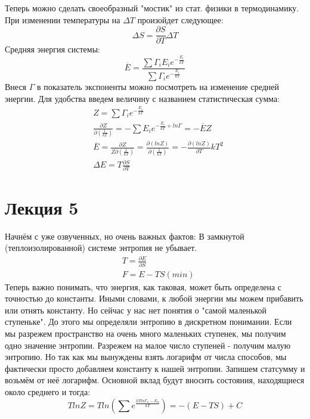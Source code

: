 \documentclass[a4paper, 12pt]{article}
\begin{document}
	Теперь можно сделать своеобразный "мостик" из стат. физики в термодинамику. При изменении температуры на $\Delta T$ произойдет следующее:
	\begin{equation*}	
		\Delta S = \frac{\partial S}{\partial T} \Delta T
	\end{equation*}
	Средняя энергия системы:
	$$
	\overline{E} = \frac{\sum \Gamma_{i} E_{i} e^{-\frac{E_{i}}{kT}}  }{\sum \Gamma_{i}  e^{-\frac{E_{i}}{kT}} }
	$$
	Внеся $\Gamma$ в показатель экспоненты можно посмотреть на изменение средней энергии. Для удобства введем величину с названием статистическая сумма:
	\begin{equation*}
		\begin{aligned}
			& Z = \sum \Gamma_{i}  e^{-\frac{E_{i}}{kT}}                                                                                                                       \\
			& \frac{\partial Z}{\partial (\frac{1}{kT})} = - \sum E_{i}  e^{-\frac{E_{i}}{kT}+ ln \Gamma} = - \overline{E} Z                                                   \\
			& \overline{E} = \frac{\partial Z}{Z \partial (\frac{1}{kT}) } =  \frac{\partial (lnZ)}{ \partial (\frac{1}{kT}) } =  -\frac{\partial (lnZ)}{ \partial T } k T^{2} \\
			& \Delta E = T \frac{\partial S}{\partial T}                                                                                                                       
		\end{aligned}
	\end{equation*}
	\section{Лекция 5}
	Начнём с уже озвученных, но очень важных фактов:
	В замкнутой (теплоизолированной) системе энтропия не убывает.
	\begin{equation*}
		\begin{aligned}
			& T = \frac{\partial E}{\partial S} \\
			& F = E - TS (min)                  
		\end{aligned}
	\end{equation*}
	Теперь важно понимать, что энергия, как таковая, может быть определена с точностью до константы. Иными словами, к любой энергии мы можем прибавить или отнять константу. Но сейчас у нас нет понятия о "самой маленькой ступеньке". До этого мы определяли энтропию в дискретном понимании. Если мы разрежем пространство на очень много маленьких ступенек, мы получим одно значение энтропии. Разрежем на малое число ступеней - получим малую энтропию. Но так как мы вынуждены взять логарифм от числа способов, мы фактически просто добавляем константу к нашей энтропии. 
	Запишем статсумму и возьмём от неё логарифм. Основной вклад будут вносить состояния, находящиеся около среднего и тогда:
	\begin{equation*}
		TlnZ= Tln (\sum e^{\frac{kTln \Gamma_{n} - E_{n}} {kT}}) = -(E-TS)+C
	\end{equation*}
\end{document}
